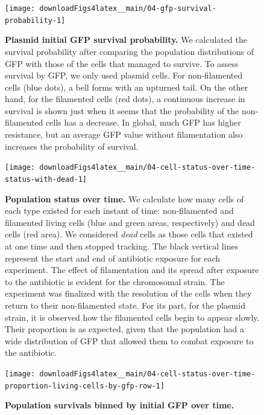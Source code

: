 \documentclass[a4paper, nobind]{templates/ociamthesis}
\begin{document}
\begin{figure}[H]
\texttt{[image: downloadFigs4latex\_\_main/04-gfp-survival-probability-1]} \caption[Plasmid initial GFP survival probability.]{\textbf{Plasmid initial GFP survival probability.} We calculated the survival probability after comparing the population distributions of GFP with those of the cells that managed to survive. To assess survival by GFP, we only used plasmid cells. For non-filamented cells (blue dots), a bell forms with an upturned tail. On the other hand, for the filamented cells (red dots), a continuous increase in survival is shown just when it seems that the probability of the non-filamented cells has a decrease. In global, much GFP has higher resistance, but an average GFP value without filamentation also increases the probability of survival.}\label{fig:04-gfp-survival-probability-1}
\end{figure}





\begin{figure}[H]
\texttt{[image: downloadFigs4latex\_\_main/04-cell-status-over-time-status-with-dead-1]} \caption[Population status over time.]{\textbf{Population status over time.} We calculate how many cells of each type existed for each instant of time: non-filamented and filamented living cells (blue and green areas, respectively) and dead cells (red area). We considered \emph{dead} cells as those cells that existed at one time and then stopped tracking. The black vertical lines represent the start and end of antibiotic exposure for each experiment. The effect of filamentation and its spread after exposure to the antibiotic is evident for the chromosomal strain. The experiment was finalized with the resolution of the cells when they return to their non-filamented state. For its part, for the plasmid strain, it is observed how the filamented cells begin to appear slowly. Their proportion is as expected, given that the population had a wide distribution of GFP that allowed them to combat exposure to the antibiotic.}\label{fig:04-cell-status-over-time-status-with-dead-1}
\end{figure}





\begin{figure}[H]
\texttt{[image: downloadFigs4latex\_\_main/04-cell-status-over-time-proportion-living-cells-by-gfp-row-1]} \caption[Population survivals binned by initial GFP over time.]{\textbf{Population survivals binned by initial GFP over time.}}\label{fig:04-cell-status-over-time-proportion-living-cells-by-gfp-row-1}
\end{figure}
\end{document}
